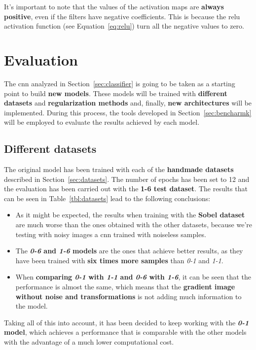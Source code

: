 It's important to note that the values of the activation maps are \textbf{always positive}, even if the filters have negative coefficients. This is because the \gls{relu} activation function (see Equation~\ref{eq:relu}) turn all the negative values to zero.

\section{Evaluation}\label{sec:new_models}
The \gls{cnn} analyzed in Section~\ref{sec:classifier} is going to be taken as a starting point to build \textbf{new models}. These models will be trained with \textbf{different datasets} and \textbf{regularization methods} and, finally, \textbf{new architectures} will be implemented. During this process, the tools developed in Section~\ref{sec:bencharmk} will be employed to evaluate the results achieved by each model.

\subsection{Different datasets}
The original model has been trained with each of the \textbf{handmade datasets} described in Section~\ref{sec:datasets}. The number of epochs has been set to 12 and the evaluation has been carried out with the \textbf{1-6 test dataset}. The results that can be seen in Table~\ref{tbl:datasets} lead to the following conclusions:
\begin{itemize}
	\item As it might be expected, the results when training with the \textbf{Sobel dataset} are much worse than the ones obtained with the other datasets, because we're testing with noisy images a \gls{cnn} trained with noiseless samples.
	\item The \textbf{\textit{0-6} and \textit{1-6} models} are the ones that achieve better results, as they have been trained with \textbf{six times more samples} than \textit{0-1} and \textit{1-1}.
	\item When \textbf{comparing \textit{0-1} with \textit{1-1} and \textit{0-6} with \textit{1-6}}, it can be seen that the performance is almost the same, which means that the \textbf{gradient image without noise and transformations} is not adding much information to the model.
\end{itemize}

Taking all of this into account, it has been decided to keep working with the \textbf{\textit{0-1} model}, which achieves a performance that is comparable with the other models with the advantage of a much lower computational cost.

